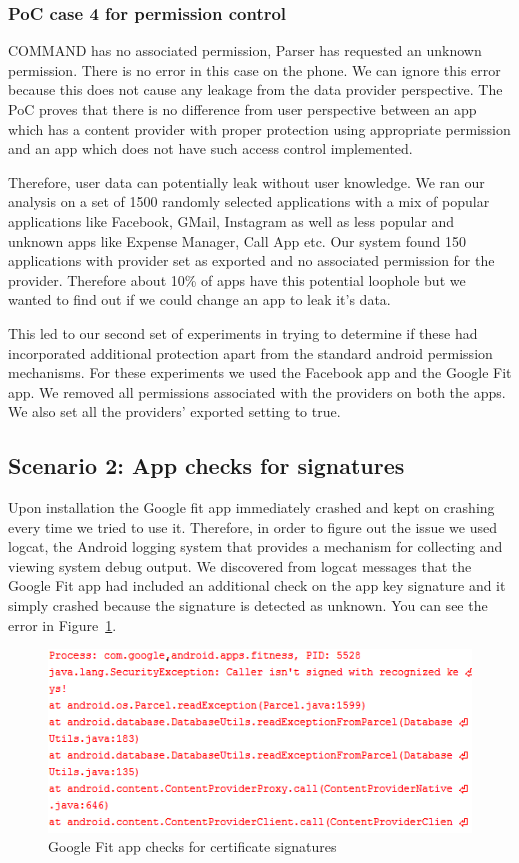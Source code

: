 \subsubsection{PoC case 4 for permission control} COMMAND has no associated permission, Parser has requested an unknown permission. There is no error in this case on the phone. We can ignore this error because this does not cause any leakage from the data provider perspective. The PoC proves that there is no difference from user perspective between an app which has a content provider with proper protection using appropriate permission and an app which does not have such access control implemented.

Therefore, user data can potentially leak without user knowledge. We ran our analysis on a set of 1500 randomly selected applications with a mix of popular applications like Facebook, GMail, Instagram as well as less popular and unknown apps like Expense Manager, Call App etc. Our system found 150 applications with provider set as exported and no associated permission for the provider. Therefore about 10\% of apps have this potential loophole but we wanted to find out if we could change an app to leak it's data. 

This led to our second set of experiments in trying to determine if these had incorporated additional protection apart from the standard android permission mechanisms. For these experiments we used the Facebook app and the Google Fit app. We removed all permissions associated with the providers on both the apps. We also set all the providers' exported setting to true.

\subsection{Scenario 2: App checks for signatures} Upon installation the Google fit app immediately crashed and kept on crashing every time we tried to use it. Therefore, in order to figure out the issue we used logcat, the Android logging system that provides a mechanism for collecting and viewing system debug output. We discovered from logcat messages that the Google Fit app had included an additional check on the app key signature and it simply crashed because the signature is detected as unknown. You can see the error in Figure~\ref{fig:GoogleProtections}.

\begin{figure}[tb]
\centering
	\includegraphics[width=\columnwidth]{images/GoogleProtections}
	\caption{Google Fit app checks for certificate signatures}
	\label{fig:GoogleProtections}
\end{figure}

